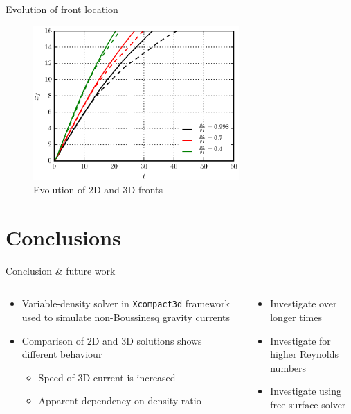 \documentclass[presentation]{beamer}
\begin{document}
\begin{frame}[label={sec:orgcad99c8}]{Evolution of front location}
\begin{figure}[htbp]
\centering
\includegraphics[width=0.7\textwidth]{./figures/2d3d_front_comparison.eps}
\caption{Evolution of 2D and 3D fronts}
\end{figure}
\end{frame}

\section{Conclusions}
\label{sec:org09693ac}

\begin{frame}[label={sec:orgb1fa8e2}]{Conclusion \& future work}
\begin{columns}
\begin{column}{0.5\columnwidth}
\begin{itemize}
\item Variable-density solver in \texttt{Xcompact3d} framework used to simulate non-Boussinesq gravity
currents
\item Comparison of 2D and 3D solutions shows different behaviour
\begin{itemize}
\item Speed of 3D current is increased
\item Apparent dependency on density ratio
\end{itemize}
\end{itemize}
\end{column}

\begin{column}{0.5\columnwidth}
\begin{itemize}
\item Investigate over longer times
\item Investigate for higher Reynolds numbers
\item Investigate using free surface solver
\end{itemize}
\end{column}
\end{columns}
\end{frame}
\end{document}
